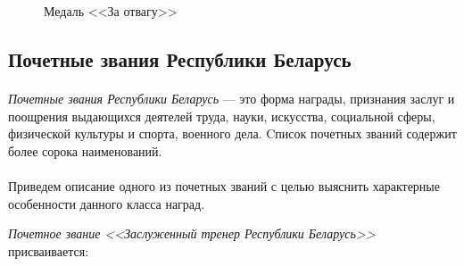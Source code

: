 \begin{figure}[h]
  \centering
  {
    \setlength{\fboxsep}{0pt}%
    \setlength{\fboxrule}{1pt}%
  }
  \caption{Медаль <<За отвагу>>}
  \label{fig:medal_otvaga}
\end{figure}

\subsection{Почетные звания Республики Беларусь}

\paragraph{}
\textit{Почетные звания Республики Беларусь} --- это форма награды,
признания заслуг и поощрения выдающихся деятелей труда, науки, искусства,
социальной сферы, физической культуры и спорта, военного дела.
Cписок почетных званий содержит более сорока наименований.

\paragraph{}
Приведем описание одного из почетных званий с целью выяснить
характерные особенности данного класса наград.

\textit{Почетное звание <<Заслуженный тренер Республики Беларусь>>}
присваивается:

